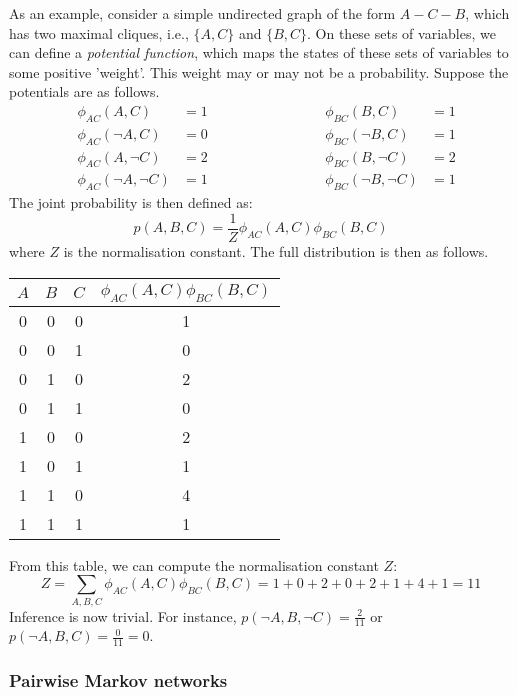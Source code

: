 \documentclass{article}
\begin{document}
\noindent As an example, consider a simple undirected graph of the form $A - C - B$, which has two maximal cliques, i.e., $\{A, C\}$ and $\{B, C\}$. On these sets of variables, we can define a \textit{potential function}, which maps the states of these sets of variables to some positive 'weight'. This weight may or may not be a probability. Suppose the potentials are as follows.
\begin{align*}
    &\phi_{AC}(A, C) &= 1           \qquad\qquad\qquad &&&\phi_{BC}(B, C) &= 1 \\
    &\phi_{AC}(\neg A, C) &= 0      \qquad\qquad\qquad &&&\phi_{BC}(\neg B, C) &= 1 \\
    &\phi_{AC}(A, \neg C) &= 2      \qquad\qquad\qquad &&&\phi_{BC}(B, \neg C) &= 2 \\
    &\phi_{AC}(\neg A, \neg C) &= 1 \qquad\qquad\qquad &&&\phi_{BC}(\neg B, \neg C) &= 1
\end{align*}
\noindent The joint probability is then defined as:
$$
    p(A, B, C) = \frac{1}{Z} \phi_{AC}(A, C)\phi_{BC}(B, C)
$$
where $Z$ is the normalisation constant. The full distribution is then as follows.
\begin{table}[H]
    \centering
    \begin{tabular}{|ccc|c|}
        \hline
        $A$ & $B$ & $C$ & $ \phi_{AC}(A, C)\phi_{BC}(B, C)$ \\ \hline
        0 & 0 & 0 & 1 \\
        0 & 0 & 1 & 0 \\
        0 & 1 & 0 & 2 \\
        0 & 1 & 1 & 0 \\
        1 & 0 & 0 & 2 \\
        1 & 0 & 1 & 1 \\
        1 & 1 & 0 & 4 \\
        1 & 1 & 1 & 1 \\\hline
    \end{tabular}
\end{table}

\noindent From this table, we can compute the normalisation constant $Z$:
$$
    Z = \sum_{A, B, C} \phi_{AC}(A, C)\phi_{BC}(B, C) = 1+0+2+0+2+1+4+1 = 11
$$
\noindent Inference is now trivial. For instance, $p(\neg A, B, \neg C) = \frac{2}{11}$ or $p(\neg A, B, C) = \frac{0}{11} = 0$.

\subsubsection{Pairwise Markov networks}
\end{document}
